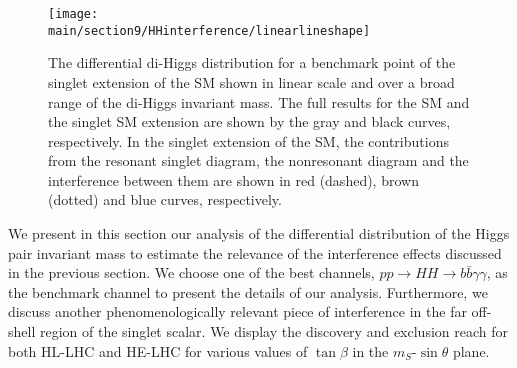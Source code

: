 \begin{figure}[t]  
  \centering
  \texttt{[image: \\main/section9/HHinterference/linearlineshape]}
  \caption{
  The differential di-Higgs distribution for a benchmark point of the singlet extension of the SM shown in linear scale and over a broad range of the di-Higgs invariant mass. The full results for the SM and the singlet SM extension  are shown by the  gray and black curves, respectively. In the singlet extension of the SM, the contributions from the resonant singlet diagram, the nonresonant diagram and the interference between them are shown in red (dashed), brown (dotted) and blue curves, respectively.  
  }
  \label{fig:phenoshape} 
\end{figure}

We present in this section our analysis of the differential distribution of the Higgs pair invariant mass to estimate the relevance of the interference effects discussed in the previous section. We choose one of the best channels, $pp\to HH \to b\bar b \gamma\gamma$, as the benchmark channel to present the details of our analysis. Furthermore, we discuss another phenomenologically relevant piece of interference in the far off-shell region of the singlet scalar. We display the discovery and exclusion reach  for both HL-LHC and HE-LHC  for various values of $\tan\beta$ in the $m_S$-$\sin\theta$ plane. 

